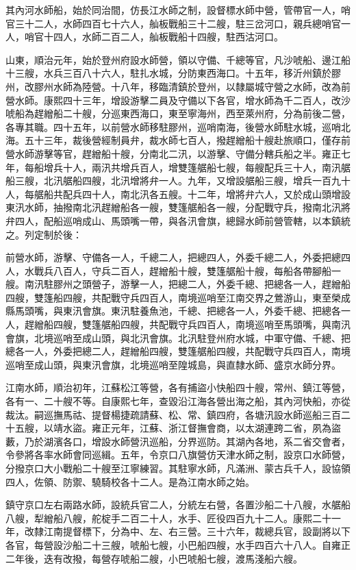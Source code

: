 \begin{pinyinscope}
其內河水師船，始於同治間，仿長江水師之制，設督標水師中營，管帶官一人，哨官三十二人，水師四百七十六人，舢板戰船三十二艘，駐三岔河口，親兵總哨官一人，哨官十四人，水師二百二人，舢板戰船十四艘，駐西沽河口。

山東，順治元年，始於登州府設水師營，領以守備、千總等官，凡沙唬船、邊江船十三艘，水兵三百八十六人，駐扎水城，分防東西海口。十五年，移沂州鎮於膠州，改膠州水師為陸營。十八年，移臨清鎮於登州，以隸屬城守營之水師，改為前營水師。康熙四十三年，增設游擊二員及守備以下各官，增水師為千二百人，改沙唬船為趕繒船二十艘，分巡東西海口，東至寧海州，西至萊州府，分為前後二營，各專其職。四十五年，以前營水師移駐膠州，巡哨南海，後營水師駐水城，巡哨北海。五十三年，裁後營經制員弁，裁水師七百人，撥趕繒船十艘赴旅順口，僅存前營水師游擊等官，趕繒船十艘，分南北二汛，以游擊、守備分轄兵船之半。雍正七年，每船增兵十人，兩汛共增兵百人，增雙篷艍船七艘，每艘配兵三十人，南汛艍船三艘，北汛艍船四艘，北汛增將弁一人。九年，又增設艍船三艘，增兵一百九十人，每艍船共配兵四十人，南北汛各五艘。十二年，增將弁六人，又於成山頭增設東汛水師，抽撥南北汛趕繒船各一艘，雙篷艍船各一艘，分配戰守兵，撥南北汛將弁四人，配船巡哨成山、馬頭嘴一帶，與各汛會旗，總歸水師前營管轄，以本鎮統之。列定制於後：

前營水師，游擊、守備各一人，千總二人，把總四人，外委千總二人，外委把總四人，水戰兵八百人，守兵二百人，趕繒船十艘，雙篷艍船十艘，每船各帶腳船一艘。南汛駐膠州之頭營子，游擊一人，把總二人，外委千總、把總各一人，趕繒船四艘，雙篷船四艘，共配戰守兵四百人，南境巡哨至江南交界之鶯游山，東至榮成縣馬頭嘴，與東汛會旗。東汛駐養魚池，千總、把總各一人，外委千總、把總各一人，趕繒船四艘，雙篷艍船四艘，共配戰守兵四百人，南境巡哨至馬頭嘴，與南汛會旗，北境巡哨至成山頭，與北汛會旗。北汛駐登州府水城，中軍守備、千總、把總各一人，外委把總二人，趕繒船四艘，雙篷艍船四艘，共配戰守兵四百人，南境巡哨至成山頭，與東汛會旗，北境巡哨至隍城島，與直隸水師、盛京水師分界。

江南水師，順治初年，江蘇松江等營，各有捕盜小快船四十艘，常州、鎮江等營，各有一、二十艘不等。自康熙七年，查毀沿江海各營出海之船，其內河快船，亦從裁汰。嗣巡撫馬祜、提督楊捷疏請蘇、松、常、鎮四府，各塘汛設水師巡船三百二十五艘，以靖水盜。雍正元年，江蘇、浙江督撫會商，以太湖連跨二省，夙為盜藪，乃於湖濱各口，增設水師營汛巡船，分界巡防。其湖內各地，系二省交會者，令參將各率水師會同巡緝。五年，令京口八旗營仿天津水師之制，設京口水師營，分撥京口大小戰船二十艘至江寧練習。其駐寧水師，凡滿洲、蒙古兵千人，設協領四人，佐領、防禦、驍騎校各十二人。是為江南水師之始。

鎮守京口左右兩路水師，設統兵官二人，分統左右營，各置沙船二十八艘，水艍船八艘，犁繒船八艘，舵椗手二百二十人，水手、匠役四百九十二人。康熙二十一年，改隸江南提督標下，分為中、左、右三營。三十六年，裁總兵官，設副將以下各官，每營設沙船二十三艘，唬船七艘，小巴船四艘，水手四百六十八人。自雍正二年後，迭有改撥，每營存唬船二艘，小巴唬船七艘，渡馬淺船六艘。


\end{pinyinscope}

